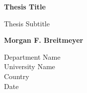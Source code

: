 \begin{titlepage}
    \begin{center}
        \vspace*{1cm}
        
        \textbf{Thesis Title}
        
        \vspace{0.5cm}
        Thesis Subtitle
        
        \vspace{1.5cm}
        
        \textbf{Morgan F. Breitmeyer}
        
        \vfill
        
        
        \vspace{0.8cm}
        
        
        Department Name\\
        University Name\\
        Country\\
        Date
        
    \end{center}
\end{titlepage}
